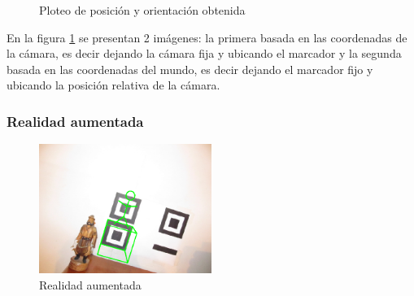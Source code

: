\begin{figure}
  \begin{center}
  \end{center}
  \caption{Ploteo de posición y orientación obtenida}
  \label{fig:plots}  
\end{figure}

En la figura \ref{fig:plots} se presentan 2 imágenes: la primera basada en las coordenadas de la cámara, es decir dejando la cámara fija y ubicando el marcador y la segunda basada en las coordenadas del mundo, es decir dejando el marcador fijo y ubicando la posición relativa de la cámara.

\subsubsection*{Realidad aumentada}

\begin{figure}
	\begin{center}
		\includegraphics[width=0.5\textwidth]{./pics_camara/resultado_ar.png}
	\end{center}
	\caption{Realidad aumentada}
	\label{fig:resultado_ar}
\end{figure}

